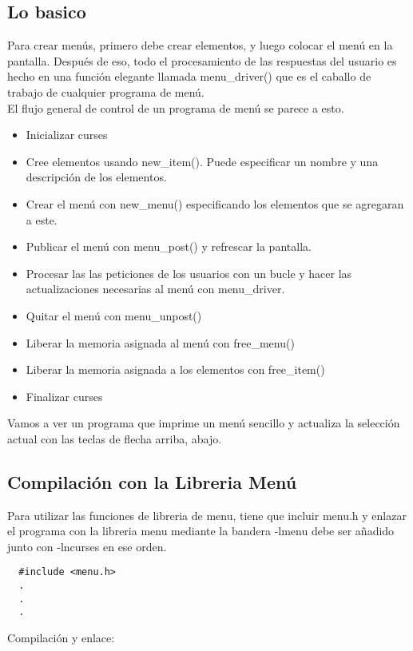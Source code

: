 \documentclass{article}
\begin{document}
\subsection{Lo basico}%
Para crear menús, primero debe crear elementos, y luego colocar el menú en la
pantalla. Después de eso, todo el procesamiento de las respuestas del usuario
es hecho en una función elegante llamada menu\_driver() que es el caballo de
trabajo de cualquier programa de menú.\\

El flujo general de control de un programa de menú se parece a esto.

\begin{itemize}
  \item Inicializar curses
  \item Cree elementos usando new\_item(). Puede especificar un nombre y una
    descripción de los elementos.
  \item Crear el menú con new\_menu() especificando los elementos que se
    agregaran a este.
  \item Publicar el menú con menu\_post() y refrescar la pantalla.
  \item Procesar las las peticiones de los usuarios con un bucle y hacer las
    actualizaciones necesarias al menú con menu\_driver.
  \item Quitar el menú con menu\_unpost()
  \item Liberar la memoria asignada al menú con free\_menu()
  \item Liberar la memoria asignada a los elementos con free\_item()
  \item Finalizar curses
\end{itemize}

Vamos a ver un programa que imprime un menú sencillo y actualiza la selección
actual con las teclas de flecha arriba, abajo.

\subsection{Compilación con la Libreria Menú}%
Para utilizar las funciones de libreria de menu, tiene que incluir menu.h y
enlazar el programa con la libreria menu mediante la bandera -lmenu debe ser
añadido junto con -lncurses en ese orden.

\begin{verbatim}
  #include <menu.h>
  .
  .
  .
\end{verbatim}

Compilación y enlace:
\end{document}
